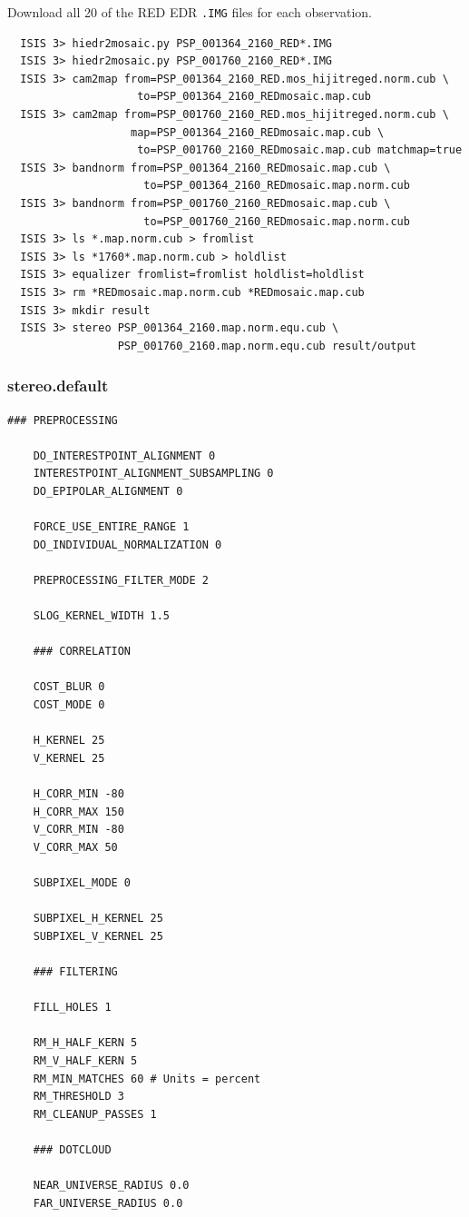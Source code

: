 Download all 20 of the RED EDR \texttt{.IMG} files for each observation.
\begin{verbatim}
  ISIS 3> hiedr2mosaic.py PSP_001364_2160_RED*.IMG
  ISIS 3> hiedr2mosaic.py PSP_001760_2160_RED*.IMG
  ISIS 3> cam2map from=PSP_001364_2160_RED.mos_hijitreged.norm.cub \
                    to=PSP_001364_2160_REDmosaic.map.cub
  ISIS 3> cam2map from=PSP_001760_2160_RED.mos_hijitreged.norm.cub \
                   map=PSP_001364_2160_REDmosaic.map.cub \
                    to=PSP_001760_2160_REDmosaic.map.cub matchmap=true
  ISIS 3> bandnorm from=PSP_001364_2160_REDmosaic.map.cub \
                     to=PSP_001364_2160_REDmosaic.map.norm.cub
  ISIS 3> bandnorm from=PSP_001760_2160_REDmosaic.map.cub \
                     to=PSP_001760_2160_REDmosaic.map.norm.cub
  ISIS 3> ls *.map.norm.cub > fromlist
  ISIS 3> ls *1760*.map.norm.cub > holdlist
  ISIS 3> equalizer fromlist=fromlist holdlist=holdlist
  ISIS 3> rm *REDmosaic.map.norm.cub *REDmosaic.map.cub
  ISIS 3> mkdir result
  ISIS 3> stereo PSP_001364_2160.map.norm.equ.cub \
                 PSP_001760_2160.map.norm.equ.cub result/output
\end{verbatim}

\subsubsection*{stereo.default}

\begin{center}\begin{minipage}{5.5in}
\begin{Verbatim}[frame=single,fontsize=\small,label=stereo.default for HiRISE East Mareotis Tholus]
    ### PREPROCESSING

    DO_INTERESTPOINT_ALIGNMENT 0
    INTERESTPOINT_ALIGNMENT_SUBSAMPLING 0
    DO_EPIPOLAR_ALIGNMENT 0

    FORCE_USE_ENTIRE_RANGE 1
    DO_INDIVIDUAL_NORMALIZATION 0

    PREPROCESSING_FILTER_MODE 2

    SLOG_KERNEL_WIDTH 1.5

    ### CORRELATION

    COST_BLUR 0
    COST_MODE 0

    H_KERNEL 25
    V_KERNEL 25

    H_CORR_MIN -80
    H_CORR_MAX 150
    V_CORR_MIN -80
    V_CORR_MAX 50

    SUBPIXEL_MODE 0

    SUBPIXEL_H_KERNEL 25
    SUBPIXEL_V_KERNEL 25

    ### FILTERING

    FILL_HOLES 1

    RM_H_HALF_KERN 5
    RM_V_HALF_KERN 5
    RM_MIN_MATCHES 60 # Units = percent
    RM_THRESHOLD 3
    RM_CLEANUP_PASSES 1

    ### DOTCLOUD

    NEAR_UNIVERSE_RADIUS 0.0
    FAR_UNIVERSE_RADIUS 0.0
\end{Verbatim}
\end{minipage}\end{center}

